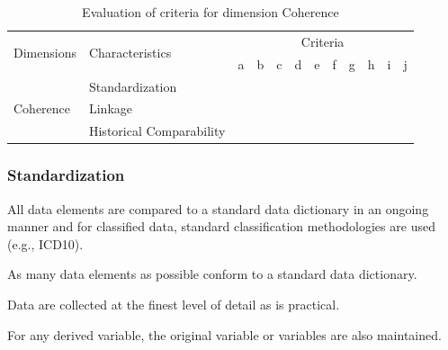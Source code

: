 \begin{table}[htbp]
    \centering

    \begin{tabular}{llrrrrrrrrrr}
        \toprule
        \multirow{2}{*}{Dimensions} & \multirow{2}{*}{Characteristics}  & \multicolumn{10}{c}{Criteria}         \\ \cmidrule(lr){3-12}
                                    &                                   & a & b & c & d & e & f & g & h & i & j \\ \midrule
        \multirow{3}{*}{Coherence}  & Standardization                   &   &   &   &   &   &   &   &   &   &   \\
                                    & Linkage                           &   &   &   &   &   &   &   &   &   &   \\
                                    & Historical Comparability          &   &   &   &   &   &   &   &   &   &   \\
        \bottomrule
    \end{tabular}

    \caption{Evaluation of criteria for dimension Coherence}
    \label{table:coherence-benchmark}
\end{table}
\FloatBarrier

\subsubsection{Standardization}

\begin{QandA}
    \item All data elements are compared to a standard data dictionary in an ongoing manner and for classified data, standard classification methodologies are used (e.g., ICD10).
    \begin{answered}
        
    \end{answered}

    \item As many data elements as possible conform to a standard data dictionary.
    \begin{answered}
        
    \end{answered}

    \item Data are collected at the finest level of detail as is practical.
    \begin{answered}
        
    \end{answered}

    \item For any derived variable, the original variable or variables are also maintained.
    \begin{answered}
        
    \end{answered}

\end{QandA}

